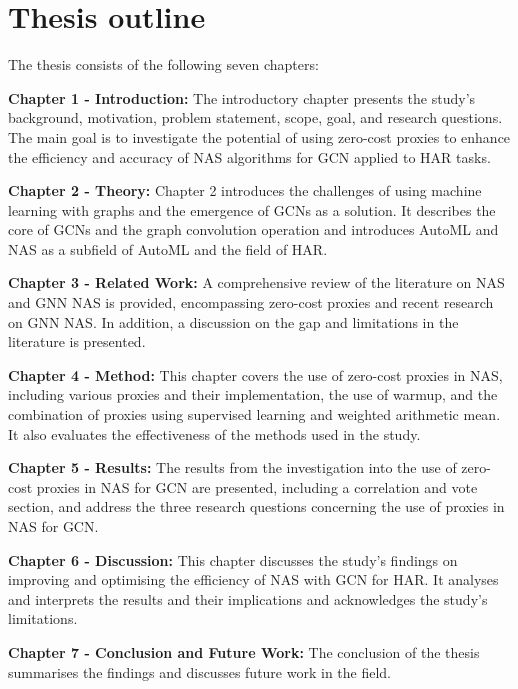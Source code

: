 \section{Thesis outline}

The thesis consists of the following seven chapters:

\textbf{Chapter 1 - Introduction:} The introductory chapter presents the study's background, motivation, problem statement, scope, goal, and research questions. The main goal is to investigate the potential of using zero-cost proxies to enhance the efficiency and accuracy of NAS algorithms for GCN applied to HAR tasks. 

\textbf{Chapter 2 - Theory:} Chapter 2 introduces the challenges of using machine learning with graphs and the emergence of GCNs as a solution. It describes the core of GCNs and the graph convolution operation and introduces AutoML and NAS as a subfield of AutoML and the field of HAR. 

\textbf{Chapter 3 - Related Work:} A comprehensive review of the literature on NAS and GNN NAS is provided, encompassing zero-cost proxies and recent research on GNN NAS. In addition, a discussion on the gap and limitations in the literature is presented. 

\textbf{Chapter 4 - Method:} This chapter covers the use of zero-cost proxies in NAS, including various proxies and their implementation, the use of warmup, and the combination of proxies using supervised learning and weighted arithmetic mean. It also evaluates the effectiveness of the methods used in the study.

\textbf{Chapter 5 - Results:} The results from the investigation into the use of zero-cost proxies in NAS for GCN are presented, including a correlation and vote section, and address the three research questions concerning the use of proxies in NAS for GCN.

\textbf{Chapter 6 - Discussion:} This chapter discusses the study's findings on improving and optimising the efficiency of NAS with GCN for HAR. It analyses and interprets the results and their implications and acknowledges the study's limitations.

\textbf{Chapter 7 - Conclusion and Future Work:} The conclusion of the thesis summarises the findings and discusses future work in the field.